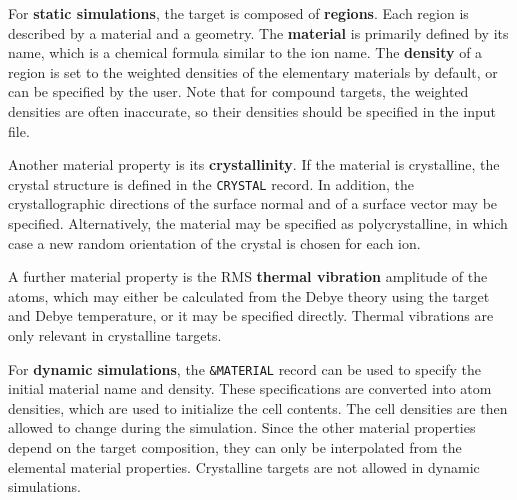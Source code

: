 For \textbf{static simulations}, the target is composed of \textbf{regions}.
Each region is described by a material and a geometry. The \textbf{material} is
primarily defined by its name, which is a chemical formula similar to the ion
name. The \textbf{density} of a region is set to the weighted densities of the
elementary materials by default, or can be specified by the user. Note that for
compound targets, the weighted densities are often inaccurate, so their
densities should be specified in the input file. 

Another material property is its \textbf{crystallinity}. If the material is
crystalline, the crystal structure is defined in the \texttt{CRYSTAL} record. In
addition, the crystallographic directions of the surface normal and of a surface
vector may be specified. Alternatively, the material may be specified as
polycrystalline, in which case a new random orientation of the crystal is chosen
for each ion. 

A further material property is the RMS \textbf{thermal vibration} amplitude of
the atoms, which may either be calculated from the Debye theory using the target
and Debye temperature, or it may be specified directly. Thermal vibrations are
only relevant in crystalline targets.

For \textbf{dynamic simulations}, the \texttt{\&MATERIAL} record can be used to
specify the initial material name and density. These specifications are
converted into atom densities, which are used to initialize the cell contents.
The cell densities are then allowed to change during the simulation. Since the
other material properties depend on the target composition, they can only be 
interpolated from the elemental material properties. Crystalline targets are not
allowed in dynamic simulations. 


